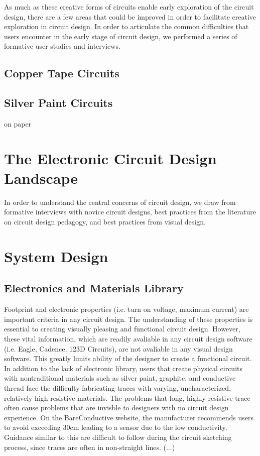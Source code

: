 \documentclass{sigchi}
\begin{document}
As much as these creative forms of circuits enable early exploration of the circuit design, there are a few areas that could be improved in order to facilitate creative exploration in circuit design. In order to articulate the common difficulties that users encounter in the early stage of circuit design, we performed a series of formative user studies and interviews. 

\subsection{Copper Tape Circuits}
\subsection{Silver Paint Circuits}
on paper


\section{The Electronic Circuit Design Landscape}
In order to understand the central concerns of circuit design, we draw from formative interviews with novice circuit designs, best practices from the literature on circuit design pedagogy, and best practices from visual design.

\section{System Design}

\subsection{Electronics and Materials Library}
Footprint and electronic properties (i.e. turn on voltage, maximum current) are important criteria in any circuit design. The understanding of these properties is essential to creating visually pleasing and functional circuit design. However, these vital information, which are readily avaliable in any circuit design software (i.e. Eagle, Cadence, 123D Circuits), are not avaliable in any visual design software. This greatly limits ability of the designer to create a functional circuit. In addition to the lack of electronic library, users that create physical circuits with nontraditional materials such as silver paint, graphite, and conductive thread face the difficulty fabricating traces with varying, uncharacterized, relatively high resistive materials. The problems that long, highly resistive trace often cause problems that are invisble to designers with no circuit design experience. On the BareConductive website, the manufacturer recommends users to avoid exceeding 30cm leading to a sensor due to the low conductivity. Guidance similar to this are difficult to follow during the circuit sketching process, since traces are often in non-straight lines. (...) 
\end{document}
